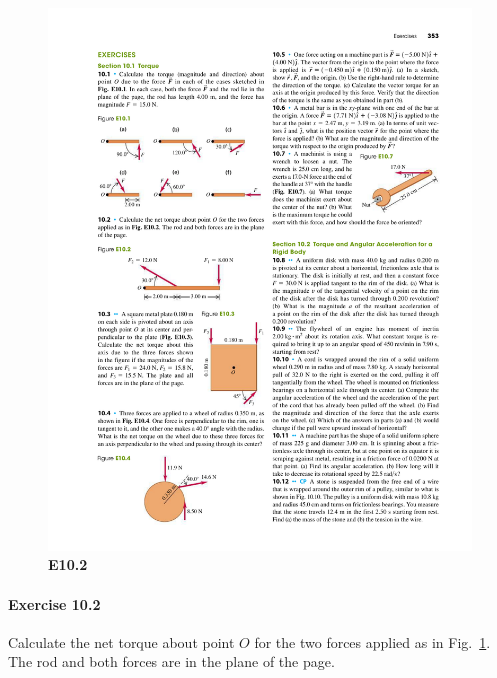 \documentclass[11pt]{article}
\newenvironment{problem}
{
    \ignorespaces
}
\renewcommand{\vec}[1]{\mathbf{#1}}
\begin{document}
\begin{figure} \centering
	\includegraphics{E10-2}
	\caption{\textbf{E10.2}}
	\label{E10.2}
\end{figure}

\paragraph{Exercise 10.2}
\begin{problem}
	Calculate the net torque about point $O$ for the two forces applied as in Fig.~\ref{E10.2}.  The rod and both forces are in the plane of the page.
\end{problem}

	

\newcommand{\ih}{}
\newcommand{\jh}{\vec{\,\hat{j}}}
\newcommand{\kh}{\vec{\,\hat{k}}}
\end{document}
